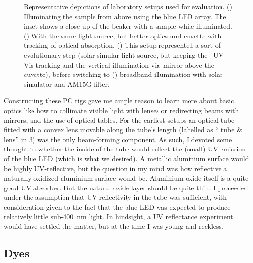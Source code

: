 \documentclass[webedition,openright,titles,swedish,english]{LuaUUThesis}\usepackage[]{graphicx}\usepackage[]{xcolor}
\newcommand{\via}{via}
\begin{document}
\begin{figure}[tbp]
\begin{subfigure}[T]{0.32\textwidth}
\begin{subfigure}{\linewidth}
      \label{fig:0400-pc-solarsimulator-suspension}
   \end{subfigure}%
\end{subfigure}%
\caption[Evolution of PC setups]{%
   Representative depictions of laboratory setups used for  evaluation.
   ()
   Illuminating the sample from above using the blue \gls{LED} array.
   The inset shows a close-up of the beaker with a sample while illuminated.
   ()
   With the same light source, but better optics and cuvette with \insitu{} tracking
   of optical absorption.
   ()
   This setup represented a sort of evolutionary step (solar simular light source,
   but keeping the \insitu\  \gls{UV-Vis} tracking and the vertical illumination
   \via\ mirror above the cuvette), before switching to
   ()
   broadband illumination with solar simulator and \gls{AM15G} filter.
}
\label{fig:0400-pc-rigs}
\end{figure}

Constructing these \gls{PC} rigs gave me ample reason to learn more
about basic optics like how to collimate visible light with lenses
or redirecting beams with mirrors, and the use of optical tables.
For the earliest setups an optical tube fitted with a convex lens
movable along the tube's length
(labelled as \enquote{ tube \& lens} in \cref{fig:0400-pc-rigs})
was the only beam-forming component. As such, I devoted some thought to
whether the inside of the tube would reflect the (small) UV emission of the
blue \gls{LED} (which is what we desired).
A metallic aluminium surface would be highly UV-reflective, but the question
in my mind was how reflective a naturally oxidized aluminium surface would be.
Aluminium oxide itself is a quite good \gls{UV} absorber. But the natural oxide layer
should be quite thin.
I proceeded under the assumption that UV reflectivity in the tube was sufficient,
with consideration given to the fact that the blue \gls{LED} was expected to
produce relatively little sub-\qty{400}{\nm} light.
In hindsight, a \gls{UV} reflectance experiment would have settled the matter,
but at the time I was young and reckless.



\subsection{Dyes}
\label{pc:dyes}
\end{document}
